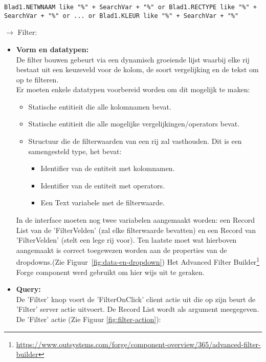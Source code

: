\begin{lstlisting}
Blad1.NETWNAAM like "%" + SearchVar + "%" or Blad1.RECTYPE like "%" + SearchVar + "%" or ... or Blad1.KLEUR like "%" + SearchVar + "%"
\end{lstlisting}

$\rightarrow$ Filter:
\begin{itemize}
    \item \textbf{Vorm en datatypen:}\\
    De filter bouwen gebeurt via een dynamisch groeiende lijst waarbij elke rij bestaat uit een keuzeveld voor de kolom, de soort vergelijking en de tekst om op te filteren.\\
    Er moeten enkele datatypen voorbereid worden om dit mogelijk te maken:
    \begin{itemize}
        \item Statische entitieit die alle kolomnamen bevat.
        \item Statische entitieit die alle mogelijke vergelijkingen/operators bevat.
        \item Structuur die de filterwaarden van een rij zal vasthouden. Dit is een samengesteld type, het bevat:
        \begin{itemize}
            \item Identifier van de entiteit met kolomnamen.
            \item Identifier van de entiteit met operators.
            \item Een Text variabele met de filterwaarde.
        \end{itemize}
    \end{itemize}
    In de interface moeten nog twee variabelen aangemaakt worden: een Record List van de 'FilterVelden' (zal elke filterwaarde bevatten) en een Record van 'FilterVelden' (stelt een lege rij voor). Ten laatste moet wat hierboven aangemaakt is correct toegewezen worden aan de properties van de dropdowns.(Zie Figuur~\ref{fig:data-en-dropdown})
    Het Advanced Filter Builder\footnote{\url{https://www.outsystems.com/forge/component-overview/365/advanced-filter-builder}} Forge component werd gebruikt om hier wijs uit te geraken.\\
    \item \textbf{Query:}\\
    De 'Filter' knop voert de 'FilterOnClick' client actie uit die op zijn beurt de 'Filter' server actie uitvoert. De Record List wordt als argument meegegeven.\\
    De 'Filter' actie (Zie Figuur \ref{fig:filter-action}):

\end{itemize}
